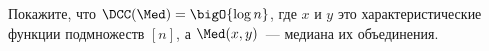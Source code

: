 Покажите, что $\DCC(\Med) = \bigO{\log n}$, где $x$ и $y$ это характеристические функции подмножеств
$[n]$, а $\Med(x, y)$~--- медиана их объединения.